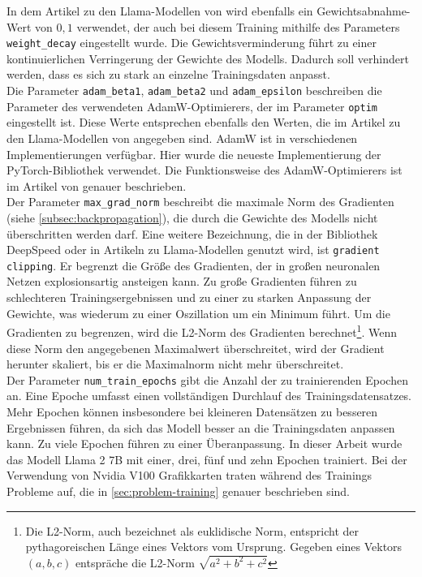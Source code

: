 In dem Artikel zu den Llama-Modellen von \citet{llama} wird ebenfalls ein Gewichtsabnahme-Wert von $0,1$ verwendet, der auch bei diesem Training mithilfe des Parameters \texttt{weight\_decay} eingestellt wurde.
Die Gewichtsverminderung führt zu einer kontinuierlichen Verringerung der Gewichte des Modells. Dadurch soll verhindert werden, dass es sich zu stark an einzelne Trainingsdaten anpasst.\\

Die Parameter \texttt{adam\_beta1}, \texttt{adam\_beta2} und \texttt{adam\_epsilon} beschreiben die Parameter des verwendeten AdamW-Optimierers, der im Parameter \texttt{optim} eingestellt ist.
Diese Werte entsprechen ebenfalls den Werten, die im Artikel zu den Llama-Modellen von \citet{llama} angegeben sind.
AdamW ist in verschiedenen Implementierungen verfügbar. Hier wurde die neueste Implementierung der PyTorch-Bibliothek verwendet.
Die Funktionsweise des AdamW-Optimierers ist im Artikel von \citet{adamw} genauer beschrieben.\\

Der Parameter \texttt{max\_grad\_norm} beschreibt die maximale Norm des Gradienten (siehe \cref{subsec:backpropagation}), die durch die Gewichte des Modells nicht überschritten werden darf.
Eine weitere Bezeichnung, die in der Bibliothek DeepSpeed oder in Artikeln zu Llama-Modellen genutzt wird, ist \texttt{gradient clipping}.
Er begrenzt die Größe des Gradienten, der in großen neuronalen Netzen explosionsartig ansteigen kann.
Zu große Gradienten führen zu schlechteren Trainingsergebnissen und zu einer zu starken Anpassung der Gewichte, was wiederum zu einer Oszillation um ein Minimum führt.
Um die Gradienten zu begrenzen, wird die L2-Norm des Gradienten berechnet\footnote{Die L2-Norm, auch bezeichnet als euklidische Norm, entspricht der pythagoreischen Länge eines Vektors vom Ursprung. Gegeben eines Vektors $(a,b,c)$ entspräche die L2-Norm $\sqrt{a^2+b^2+c^2}$}.
Wenn diese Norm den angegebenen Maximalwert überschreitet, wird der Gradient herunter skaliert, bis er die Maximalnorm nicht mehr überschreitet.\\

Der Parameter \texttt{num\_train\_epochs} gibt die Anzahl der zu trainierenden Epochen an.
Eine Epoche umfasst einen vollständigen Durchlauf des Trainingsdatensatzes.
Mehr Epochen können insbesondere bei kleineren Datensätzen zu besseren Ergebnissen führen, da sich das Modell besser an die Trainingsdaten anpassen kann.
Zu viele Epochen führen zu einer Überanpassung.
In dieser Arbeit wurde das Modell Llama 2 7B mit einer, drei, fünf und zehn Epochen trainiert.
Bei der Verwendung von Nvidia V100 Grafikkarten traten während des Trainings Probleme auf, die in \cref{sec:problem-training} genauer beschrieben sind.\\

